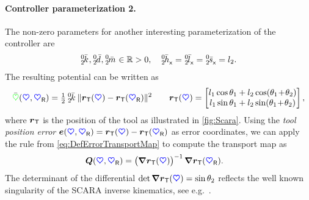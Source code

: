 \paragraph{Controller parameterization 2.}
The non-zero parameters for another interesting parameterization of the controller are
\begin{align}
 \bodyStiffnessC{0}{2}, \bodyDampingC{0}{2}, \bodyMassC{0}{2} \in \RealNum > 0,
\quad
 \bodyCOSCoeffC{0}{2}{\idxX} = \bodyCODCoeffC{0}{2}{\idxX} = \bodyCOMCoeffC{0}{2}{\idxX} = l_2.
\end{align}
The resulting potential can be written as
\begin{align}
 \potentialEnergyC(\sysCoord, \sysCoordR) = \tfrac{1}{2} \, \bodyStiffnessC{0}{2} \, \norm{\toolPos(\sysCoord) - \toolPos(\sysCoordR)}^2
\qquad
 \toolPos(\sysCoord) = 
 \begin{bmatrix}
  l_1 \cos \jointAngle[1] + l_2 \cos (\jointAngle[1] \!+\! \jointAngle[2]) \\
  l_1 \sin \jointAngle[1] + l_2 \sin (\jointAngle[1] \!+\! \jointAngle[2]) \\
 \end{bmatrix},
\end{align}
where $\toolPos$ is the position of the tool as illustrated in \autoref{fig:Scara}.
Using the \textit{tool position error} $\sysCoordE(\sysCoord, \sysCoordR) = \toolPos(\sysCoord) - \toolPos(\sysCoordR)$ as error coordinates, we can apply the rule from \eqref{eq:DefErrorTransportMap} to compute the transport map as
\begin{align}
 \sysTransportMap(\sysCoord, \sysCoordR) &= \big( \differential\toolPos (\sysCoord) \big)^{-1} \, \differential \toolPos (\sysCoordR).
\end{align}
The determinant of the differential $\det\differential\toolPos(\sysCoord) = \sin\jointAngle[2]$ reflects the well known singularity of the SCARA inverse kinematics, see e.g.\ \cite[example 3.6]{Murray:Robotic}.

